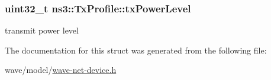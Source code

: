 \subsubsection[{\texorpdfstring{tx\+Power\+Level}{txPowerLevel}}]{\setlength{\rightskip}{0pt plus 5cm}uint32\+\_\+t ns3\+::\+Tx\+Profile\+::tx\+Power\+Level}\hypertarget{structns3_1_1TxProfile_a194d9d200726947b1878974701b88ee6}{}\label{structns3_1_1TxProfile_a194d9d200726947b1878974701b88ee6}


transmit power level 



The documentation for this struct was generated from the following file\+:\begin{DoxyCompactItemize}
\item 
wave/model/\hyperlink{wave-net-device_8h}{wave-\/net-\/device.\+h}\end{DoxyCompactItemize}
